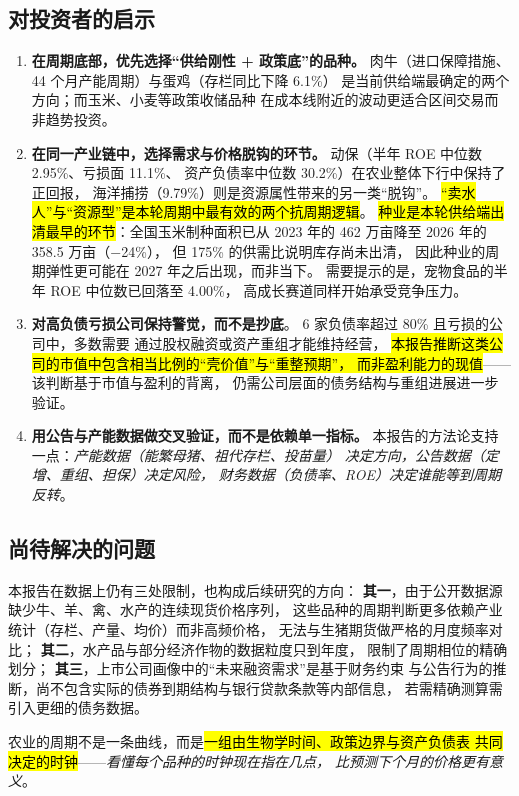 \subsection{对投资者的启示}

\begin{enumerate}[leftmargin=1.5em, itemsep=2pt]
  \item \textbf{在周期底部，优先选择“供给刚性 + 政策底”的品种。}
        肉牛（进口保障措施、\num{44} 个月产能周期）与蛋鸡（存栏同比下降 \num{6.1}\%）
        是当前供给端最确定的两个方向；而玉米、小麦等政策收储品种
        在成本线附近的波动更适合区间交易而非趋势投资。
  \item \textbf{在同一产业链中，选择需求与价格脱钩的环节。}
        动保（半年 ROE 中位数 \num{2.95}\%、亏损面 \num{11.1}\%、
        资产负债率中位数 \num{30.2}\%）在农业整体下行中保持了正回报，
        海洋捕捞（\num{9.79}\%）则是资源属性带来的另一类“脱钩”。
        \hl{“卖水人”与“资源型”是本轮周期中最有效的两个抗周期逻辑}。
        \hl{种业是本轮供给端出清最早的环节}：全国玉米制种面积已从 2023 年的
        \num{462} 万亩降至 2026 年的 \num{358.5} 万亩（\num{-24}\%），
        但 \num{175}\% 的供需比说明库存尚未出清，
        因此种业的周期弹性更可能在 2027 年之后出现，而非当下。
        需要提示的是，宠物食品的半年 ROE 中位数已回落至 \num{4.00}\%，
        高成长赛道同样开始承受竞争压力。
  \item \textbf{对高负债亏损公司保持警觉，而不是抄底}。
        \num{6} 家负债率超过 \num{80}\% 且亏损的公司中，多数需要
        通过股权融资或资产重组才能维持经营，
        \hl{本报告推断这类公司的市值中包含相当比例的“壳价值”与“重整预期”，
        而非盈利能力的现值}——该判断基于市值与盈利的背离，
        仍需公司层面的债务结构与重组进展进一步验证。
  \item \textbf{用公告与产能数据做交叉验证，而不是依赖单一指标。}
        本报告的方法论支持一点：\emph{产能数据（能繁母猪、祖代存栏、投苗量）
        决定方向，公告数据（定增、重组、担保）决定风险，
        财务数据（负债率、ROE）决定谁能等到周期反转}。
\end{enumerate}

\subsection{尚待解决的问题}

本报告在数据上仍有三处限制，也构成后续研究的方向：
\textbf{其一}，由于公开数据源缺少牛、羊、禽、水产的连续现货价格序列，
这些品种的周期判断更多依赖产业统计（存栏、产量、均价）而非高频价格，
无法与生猪期货做严格的月度频率对比；
\textbf{其二}，水产品与部分经济作物的数据粒度只到年度，
限制了周期相位的精确划分；
\textbf{其三}，上市公司画像中的“未来融资需求”是基于财务约束
与公告行为的推断，尚不包含实际的债券到期结构与银行贷款条款等内部信息，
若需精确测算需引入更细的债务数据。

\begin{keybox}[一句话总结]
\normalsize
农业的周期不是一条曲线，而是\hl{一组由生物学时间、政策边界与资产负债表
共同决定的时钟}——\emph{看懂每个品种的时钟现在指在几点，
比预测下个月的价格更有意义}。
\end{keybox}
